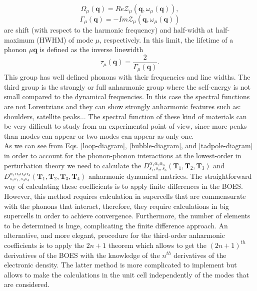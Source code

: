 \begin{equation}
 \label{lineshift}
 \Omega_{\mu}(\mathbf{q})=Re\mathcal{Z}_{\mu}(\mathbf{q},\omega_{\mu}(\mathbf{q})),
\end{equation}
\begin{equation}
 \label{linewidth}
 \Gamma_{\mu}(\mathbf{q})=-Im\mathcal{Z}_{\mu}(\mathbf{q},\omega_{\mu}(\mathbf{q}))
\end{equation}
are shift (with respect to the harmonic frequency) and half-width at half-maximum (HWHM) of mode $\mu$, respectively. In this limit, the lifetime of a phonon $\mu\mathbf{q}$ is defined as the inverse linewidth 
\begin{equation}
\label{lifetime}
 \tau_{\mu}(\mathbf{q})=\frac{2}{\Gamma_{\mu}(\mathbf{q})}.
\end{equation}
This group has well defined phonons with their frequencies and line widths. The third group is the strongly or full anharmonic group where the self-energy is not small compared to the dynamical frequencies. In this case the spectral
functions are not Lorentzians and they can show strongly anharmonic features such as: shoulders, satellite peaks$\dots$ The spectral function of these kind of materials can be very difficult to study from an experimental
point of view, since more peaks than modes can appear or two modes can appear as only one. \\

As we can see from Eqs. \ref{loop-diagram}, \ref{bubble-diagram}, and \ref{tadpole-diagram} in order to account for the phonon-phonon interactions at the lowest-order in perturbation theory we need to calculate 
the $D_{s_{1},s_{2},s_{3}}^{\alpha_{1}\alpha_{2}\alpha_{3}}(\mathbf{T}_{1},\mathbf{T}_{2},\mathbf{T}_{3})$ and $D_{s_{1}s_{1},s_{3}s_{4}}^{\alpha_{1}\alpha_{2}\alpha_{3}\alpha_{4}}(\mathbf{T}_{1},\mathbf{T}_{2},\mathbf{T}_{
3},\mathbf{T}_{4})$ anharmonic dynamical matrices. The straightforward way of calculating these coefficients is to apply finite differences in the BOES\cite{li2014shengbte}. However, this method requires calculation in 
supercells that are commensurate with the phonons that interact, therefore, they require calculations in big supercells in order to achieve convergence. Furthermore, the number of elements to be determined is huge, complicating 
the finite difference approach. An alternative, and more elegant, procedure for the third-order anharmonic coefficients is to apply the $2n+1$ theorem\cite{gonze1989density} which allows to get the $(2n+1)^{th}$ derivatives 
of the BOES with the knowledge of the $n^{th}$ derivatives of the electronic density. The latter method is more complicated to implement\cite{paulatto2013anharmonic} but allows to make the calculations in the unit cell 
independently of the modes that are considered.  


